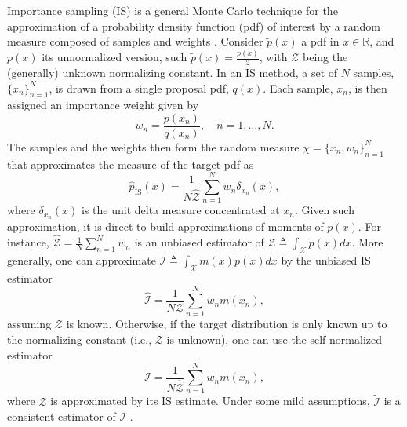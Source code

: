 \documentclass[review]{elsarticle}
\newcommand{\normalized}{\tilde}
\newcommand{\Ic}{\mathcal{I}}
\newcommand{\Zc}{\mathcal{Z}}
\newcommand{\Real}{\mathbb{R}}
\begin{document}
Importance sampling (IS) is a general Monte Carlo technique for the approximation of a probability density function (pdf) of interest by a random measure composed of samples and weights \cite{Robert04}. Consider $\normalized p(x)$ a pdf in $x\in\Real$, and $p(x)$ its unnormalized version, such $\normalized p(x) = \frac{p(x)}{\Zc}$, with $\Zc$ being the (generally) unknown normalizing constant. In an IS method, a set of $N$ samples, $\{x_n\}_{n=1}^N$, is drawn from a {single} proposal pdf, $q(x)$. Each sample, ${x_n}$, is then assigned an importance weight given by
 \begin{equation} 
	w_n= \frac{p(x_n)}{{q(x_n)}}, \quad n=1,\ldots,N.
\label{is_weights_static}
\end{equation} 
The samples and the weights then form the random measure $\chi=\{x_n,w_n\}_{n=1}^N$ that approximates the measure of the target pdf as
\begin{equation}
	{\widehat p}_{\text{IS}} (x)= \frac{1}{N\widehat{\Zc}}  \sum_{n=1}^N w_n \delta_{x_n}(x),
\label{approx_pi}
\end{equation}
where  $\delta_{x_n}(x)$ is the unit delta measure 
concentrated at $x_n$. Given such approximation, it is direct to build approximations of moments of $p(x)$. For instance, $\widehat{\Zc} = \frac{1}{N}\sum_{n=1}^N w_n$ is an unbiased estimator of $\Zc\triangleq\int_{\mathcal{X}} \tilde{p}(x) dx$. More generally, one can approximate $\Ic \triangleq  \int_{\mathcal{X}} {m(x)} \normalized p(x) dx$ by the unbiased IS estimator 
%
\begin{equation}
\widehat{\Ic} = \frac{1}{N\Zc} \sum_{n=1}^N w_n  {m(x_n)},
\label{eq_IS_estimator_unnorm}
\end{equation}
assuming $\Zc$ is known. Otherwise, if the target distribution is only known up to the normalizing constant (i.e., $\Zc$ is unknown), one can use the self-normalized estimator 
\begin{equation}
	\widetilde{\Ic} = \frac{1}{N\widehat{\Zc}}  \sum_{n=1}^N w_n {m(x_n)},
\label{eq_IS_estimator_norm}
\end{equation}
where $\Zc$ is approximated by its IS estimate. Under some mild assumptions,  $\widetilde{\Ic}$ is a consistent estimator of $\Ic$ \cite{Robert04,mcbook,elvira2021advances}. 
\end{document}

